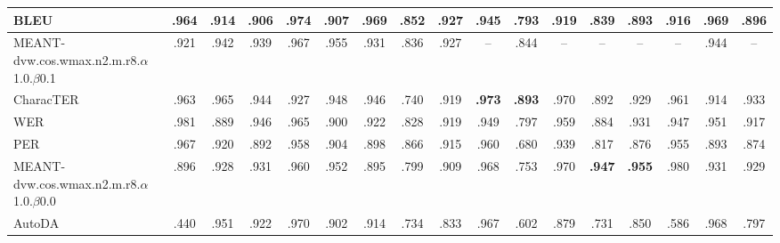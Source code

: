 \begin{landscape}
\begin{table}
\begin{tabular}{m{}cccccccc|cccccccc}
BLEU & .964  & .914  & .906  & .974  & .907  & .969  & .852  & .927  & .945  & .793  & .919  & .839  & .893  & .916  & .969  & .896  \\ \hline
MEANT-dvw.cos.wmax.n2.m.r8.$\alpha $1.0.$\beta $0.1 & .921  & .942  & .939  & .967  & .955  & .931  & .836  & .927  & --  & .844  & --  & --  & --  & --  & .944  & --  \\ \hline
CharacTER & .963  & .965  & .944  & .927  & .948  & .946  & .740  & .919  & \textbf{.973 } & \textbf{.893 } & .970  & .892  & .929  & .961  & .914  & .933 \\ \hline
WER & .981  & .889  & .946  & .965  & .900  & .922  & .828  & .919  & .949  & .797  & .959  & .884  & .931  & .947  & .951  & .917  \\ \hline
PER & .967  & .920  & .892  & .958  & .904  & .898  & .866  & .915  & .960  & .680  & .939  & .817  & .876  & .955  & .893  & .874  \\ \hline
MEANT-dvw.cos.wmax.n2.m.r8.$\alpha $1.0.$\beta $0.0 & .896  & .928  & .931  & .960  & .952  & .895  & .799  & .909  & .968  & .753  & .970  & \textbf{.947 } & \textbf{.955 } & .980  & .931  & .929  \\ \hline
AutoDA & .440  & .951  & .922  & .970  & .902  & .914  & .734  & .833  & .967  & .602  & .879  & .731  & .850  & .586  & .968  & .797  \\ \hline
\end{tabular}
\label{table_wmt17_sys}
\end{table}
\end{landscape} 
